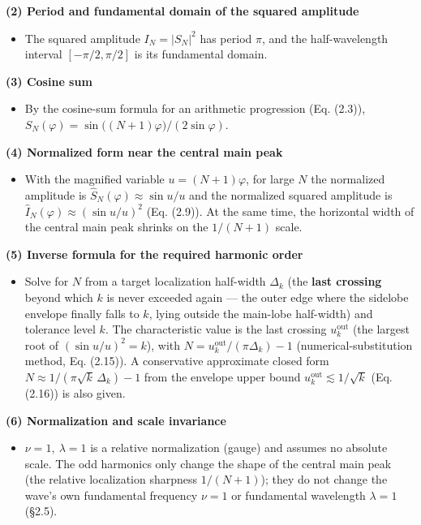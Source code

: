\documentclass[
]{ltjsarticle}
\providecommand{\tightlist}{%
  \setlength{\itemsep}{0pt}\setlength{\parskip}{0pt}}
\begin{document}
\textbf{(2) Period and fundamental domain of the squared amplitude}

\begin{itemize}
\tightlist
\item
  The squared amplitude \(I_N=|S_N|^2\) has period \(\pi\), and the
  half-wavelength interval \([-\pi/2,\pi/2]\) is its fundamental domain.
\end{itemize}

\textbf{(3) Cosine sum}

\begin{itemize}
\tightlist
\item
  By the cosine-sum formula for an arithmetic progression (Eq. (2.3)),
  \(S_N(\varphi)=\sin\!\big((N+1)\varphi\big)/(2\sin\varphi)\).
\end{itemize}

\textbf{(4) Normalized form near the central main peak}

\begin{itemize}
\tightlist
\item
  With the magnified variable \(u=(N+1)\varphi\), for large \(N\) the
  normalized amplitude is \(\widehat{S}_N(\varphi)\approx \sin u/u\) and
  the normalized squared amplitude is
  \(\widehat{I}_N(\varphi)\approx(\sin u/u)^2\) (Eq. (2.9)). At the same
  time, the horizontal width of the central main peak shrinks on the
  \(1/(N+1)\) scale.
\end{itemize}

\textbf{(5) Inverse formula for the required harmonic order}

\begin{itemize}
\tightlist
\item
  Solve for \(N\) from a target localization half-width \(\Delta_k\)
  (the \textbf{last crossing} beyond which \(k\) is never exceeded again
  --- the outer edge where the sidelobe envelope finally falls to \(k\),
  lying outside the main-lobe half-width) and tolerance level \(k\). The
  characteristic value is the last crossing \(u_k^{\mathrm{out}}\) (the
  largest root of \((\sin u/u)^2=k\)), with
  \(N=u_k^{\mathrm{out}}/(\pi\Delta_k)-1\) (numerical-substitution
  method, Eq. (2.15)). A conservative approximate closed form
  \(N\approx1/(\pi\sqrt{k}\,\Delta_k)-1\) from the envelope upper bound
  \(u_k^{\mathrm{out}}\lesssim1/\sqrt{k}\) (Eq. (2.16)) is also given.
\end{itemize}

\textbf{(6) Normalization and scale invariance}

\begin{itemize}
\tightlist
\item
  \(\nu=1,\ \lambda=1\) is a relative normalization (gauge) and assumes
  no absolute scale. The odd harmonics only change the shape of the
  central main peak (the relative localization sharpness \(1/(N+1)\));
  they do not change the wave's own fundamental frequency \(\nu=1\) or
  fundamental wavelength \(\lambda=1\) (§2.5).
\end{itemize}
\end{document}
